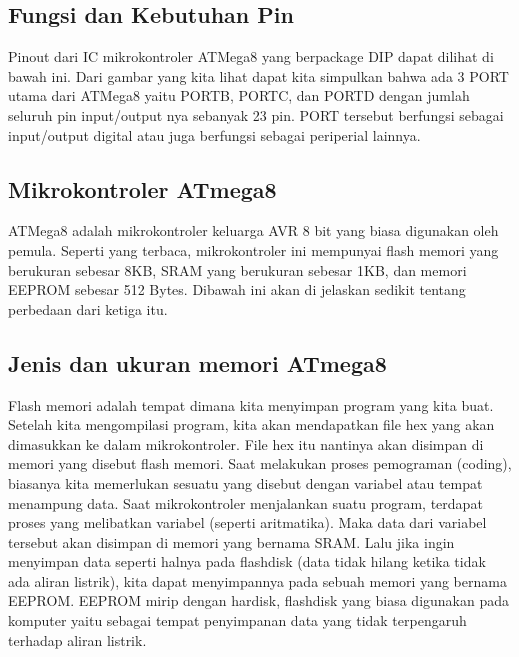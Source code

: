 	\subsection{Fungsi dan Kebutuhan Pin}
		Pinout dari IC mikrokontroler ATMega8 yang berpackage DIP dapat dilihat di bawah ini.
		Dari gambar yang kita lihat dapat kita simpulkan bahwa ada 3 PORT utama dari ATMega8 yaitu PORTB, PORTC, dan PORTD dengan jumlah seluruh pin input/output nya sebanyak 23 pin. PORT tersebut berfungsi sebagai input/output digital atau juga berfungsi sebagai periperial lainnya.
		
	\subsection{Mikrokontroler ATmega8}
		ATMega8 adalah mikrokontroler keluarga AVR 8 bit yang biasa digunakan oleh pemula. Seperti yang terbaca, mikrokontroler ini mempunyai flash memori yang berukuran sebesar 8KB, SRAM yang berukuran sebesar 1KB, dan memori EEPROM sebesar 512 Bytes. Dibawah ini akan di jelaskan sedikit tentang perbedaan dari ketiga itu.
	\subsection{Jenis dan ukuran memori ATmega8}
		Flash memori adalah tempat dimana kita  menyimpan program yang kita buat. Setelah kita mengompilasi program, kita akan mendapatkan file hex yang akan dimasukkan ke dalam  mikrokontroler. File hex itu nantinya akan disimpan di memori yang disebut flash memori. Saat melakukan proses pemograman (coding), biasanya kita memerlukan sesuatu yang disebut dengan variabel atau tempat menampung data.
		Saat mikrokontroler menjalankan suatu program, terdapat proses yang melibatkan variabel (seperti aritmatika). Maka data dari variabel tersebut akan disimpan di memori yang bernama SRAM. Lalu jika ingin menyimpan data seperti halnya pada flashdisk (data tidak hilang ketika tidak ada aliran listrik), kita dapat menyimpannya pada sebuah memori yang bernama EEPROM. EEPROM mirip dengan hardisk, flashdisk yang biasa digunakan pada komputer yaitu sebagai tempat penyimpanan data yang tidak terpengaruh terhadap aliran listrik.
